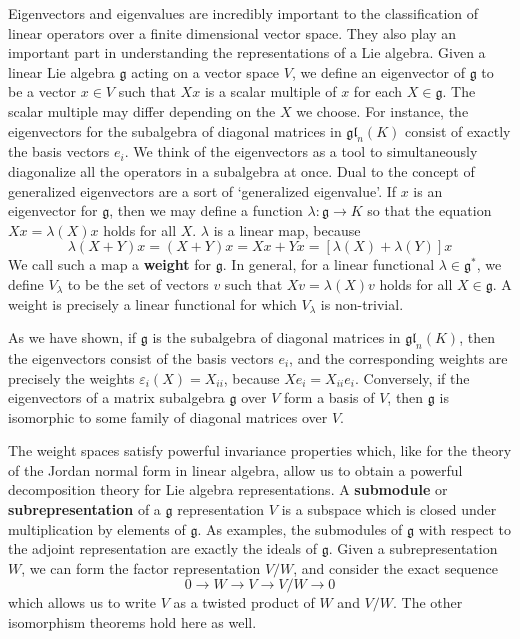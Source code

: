 Eigenvectors and eigenvalues are incredibly important to the classification of linear operators over a finite dimensional vector space. They also play an important part in understanding the representations of a Lie algebra. Given a linear Lie algebra $\mathfrak{g}$ acting on a vector space $V$, we define an eigenvector of $\mathfrak{g}$ to be a vector $x \in V$ such that $Xx$ is a scalar multiple of $x$ for each $X \in \mathfrak{g}$. The scalar multiple may differ depending on the $X$ we choose. For instance, the eigenvectors for the subalgebra of diagonal matrices in $\mathfrak{gl}_n(K)$ consist of exactly the basis vectors $e_i$. We think of the eigenvectors as a tool to simultaneously diagonalize all the operators in a subalgebra at once. Dual to the concept of generalized eigenvectors are a sort of `generalized eigenvalue'. If $x$ is an eigenvector for $\mathfrak{g}$, then we may define a function $\lambda: \mathfrak{g} \to K$ so that the equation $Xx = \lambda(X)x$ holds for all $X$. $\lambda$ is a linear map, because
%
\[ \lambda(X + Y)x = (X + Y)x = Xx + Yx = [\lambda(X) + \lambda(Y)]x \]
%
We call such a map a {\bf weight} for $\mathfrak{g}$. In general, for a linear functional $\lambda \in \mathfrak{g}^*$, we define $V_\lambda$ to be the set of vectors $v$ such that $Xv = \lambda(X)v$ holds for all $X \in \mathfrak{g}$. A weight is precisely a linear functional for which $V_\lambda$ is non-trivial.

\begin{example}
    As we have shown, if $\mathfrak{g}$ is the subalgebra of diagonal matrices in $\mathfrak{gl}_n(K)$, then the eigenvectors consist of the basis vectors $e_i$, and the corresponding weights are precisely the weights $\varepsilon_i(X) = X_{ii}$, because $Xe_i = X_{ii} e_i$. Conversely, if the eigenvectors of a matrix subalgebra $\mathfrak{g}$ over $V$ form a basis of $V$, then $\mathfrak{g}$ is isomorphic to some family of diagonal matrices over $V$.
\end{example}

The weight spaces satisfy powerful invariance properties which, like for the theory of the Jordan normal form in linear algebra, allow us to obtain a powerful decomposition theory for Lie algebra representations. A {\bf submodule} or {\bf subrepresentation} of a $\mathfrak{g}$ representation $V$ is a subspace which is closed under multiplication by elements of $\mathfrak{g}$. As examples, the submodules of $\mathfrak{g}$ with respect to the adjoint representation are exactly the ideals of $\mathfrak{g}$. Given a subrepresentation $W$, we can form the factor representation $V/W$, and consider the exact sequence
%
\[ 0 \to W \to V \to V/W \to 0 \]
%
which allows us to write $V$ as a twisted product of $W$ and $V/W$. The other isomorphism theorems hold here as well.

